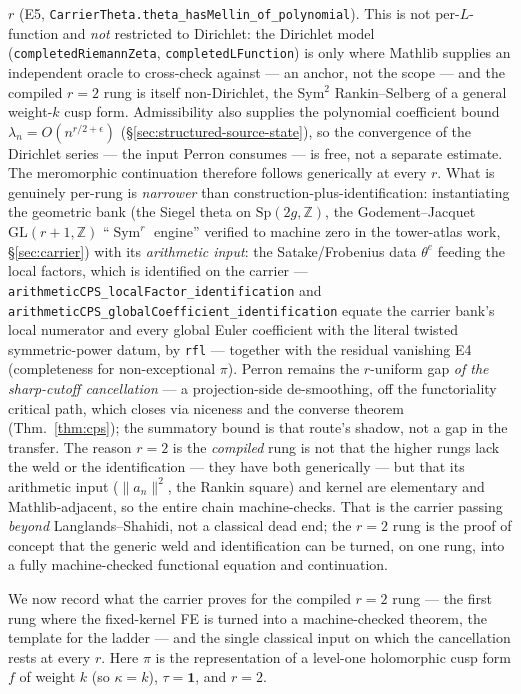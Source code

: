\documentclass[11pt]{article}
\theoremstyle{definition}
\newcommand{\Sym}{\operatorname{Sym}}
\begin{document}
\begin{itemize}
$r$ (E5, \texttt{CarrierTheta.theta\_hasMellin\_of\_polynomial}). This is not per-$L$-function and
\emph{not} restricted to Dirichlet: the Dirichlet model
(\texttt{completedRiemannZeta}, \texttt{completedLFunction}) is only where Mathlib supplies an
independent oracle to cross-check against --- an anchor, not the scope --- and the compiled $r=2$
rung is itself non-Dirichlet, the Sym$^2$ Rankin--Selberg of a general weight-$k$ cusp form.
Admissibility also supplies the polynomial coefficient bound $\lambda_n=O(n^{r/2+\epsilon})$
(\S\ref{sec:structured-source-state}), so the convergence of the Dirichlet series --- the input
Perron consumes --- is free, not a separate estimate. The meromorphic continuation therefore
follows generically at every $r$. What is genuinely per-rung is
\emph{narrower} than construction-plus-identification: instantiating the geometric bank (the
Siegel theta on $\mathrm{Sp}(2g,\mathbb Z)$, the Godement--Jacquet $\mathrm{GL}(r{+}1,\mathbb Z)$
``$\Sym^r$ engine'' verified to machine zero in the tower-atlas work, \S\ref{sec:carrier}) with its
\emph{arithmetic input}: the Satake/Frobenius data $\theta^{e}$ feeding the local factors, which
is identified on the carrier ---
\texttt{arithmeticCPS\_localFactor\_identification} and
\texttt{arithmeticCPS\_globalCoefficient\_identification} equate the carrier bank's local numerator
and every global Euler coefficient with the literal twisted symmetric-power datum, by
\texttt{rfl} --- together with the residual vanishing E4 (completeness for non-exceptional $\pi$).
Perron remains the $r$-uniform gap \emph{of the sharp-cutoff cancellation} --- a projection-side
de-smoothing, off the functoriality critical path, which closes via niceness and the converse
theorem (Thm.~\ref{thm:cps}); the summatory bound is that route's shadow, not a gap in the transfer.
The reason $r=2$ is the \emph{compiled} rung is not that the
higher rungs lack the weld or the identification --- they have both generically --- but that its
arithmetic input ($\lVert a_n\rVert^2$, the Rankin square) and kernel are elementary and
Mathlib-adjacent, so the entire chain machine-checks. That is the carrier passing \emph{beyond}
Langlands--Shahidi, not a classical dead end; the $r=2$ rung is the proof of concept that the
generic weld and identification can be turned, on one rung, into a fully machine-checked
functional equation and continuation.
\end{itemize}
We now record what the carrier proves for the compiled $r=2$ rung --- the first rung where the
fixed-kernel FE is turned into a machine-checked theorem, the template for the ladder --- and
the single classical input on which the cancellation rests at every $r$. Here $\pi$ is the
representation of a level-one holomorphic cusp form $f$ of weight $k$ (so $\kappa=k$),
$\tau=\mathbf 1$, and $r=2$.
\end{document}
